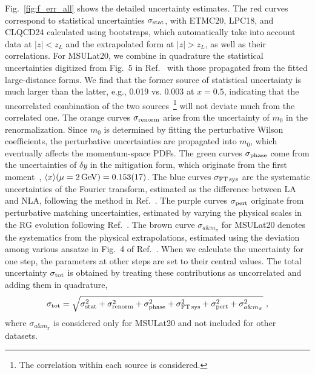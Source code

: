 Fig.~\ref{fig:f_err_all} shows the detailed uncertainty estimates. The red curves correspond to statistical uncertainties $\sigma_{\rm stat}$, with ETMC20, LPC18, and CLQCD24 calculated using bootstraps, which automatically take into account data at $|z|<z_L$ and the extrapolated form at $|z|>z_L$, as well as their correlations. For MSULat20, we combine in quadrature the statistical uncertainties digitized from Fig.~5 in Ref.~\cite{Lin:2020fsj} with those propagated from the fitted large-distance forms. We find that the former source of statistical uncertainty is much larger than the latter, e.g., 0.019 vs. 0.003 at $x=0.5$, indicating that the uncorrelated combination of the two sources~\footnote{The correlation within each source is considered.} will not deviate much from the correlated one. The orange curves $\sigma_{\rm renorm}$ arise from the uncertainty of $m_0$ in the renormalization. Since $m_0$ is determined by fitting the perturbative Wilson coefficients, the perturbative uncertainties are propagated into $m_0$, which eventually affects the momentum-space PDFs. The green curves $\sigma_{\rm phase}$ come from the uncertainties of $\delta y$ in the mitigation form, which originate from the first moment~\cite{Djukanovic:2024krw}, $\langle x \rangle(\mu=2\, {\rm GeV})=0.153(17)$. The blue curves $\sigma_{\rm FT \, sys}$ are the systematic uncertainties of the Fourier transform, estimated as the difference between LA and NLA, following the method in Ref.~\cite{Ji:2026vir}. The purple curves $\sigma_{\rm pert}$ originate from perturbative matching uncertainties, estimated by varying the physical scales in the RG evolution following Ref.~\cite{Ji:2024hit}. The brown curve $\sigma_{a\& m_{\pi}}$ for MSULat20 denotes the systematics from the physical extrapolations, estimated using the deviation among various ansatze in Fig.~4 of Ref.~\cite{Lin:2020fsj}. When we calculate the uncertainty for one step, the parameters at other steps are set to their central values. The total uncertainty $\sigma_{\rm tot}$ is obtained by treating these contributions as uncorrelated and adding them in quadrature,
\begin{align}
\sigma_{\rm tot} = \sqrt{ \sigma_{\rm stat}^2 + \sigma_{\rm renorm}^2 + \sigma_{\rm phase}^2 + \sigma_{\rm FT \, sys}^2 + \sigma_{\rm pert}^2 + \sigma_{a\& m_{\pi}}^2} \ ,
\end{align}
where $\sigma_{a\& m_{\pi}}$ is considered only for MSULat20 and not included for other datasets. 